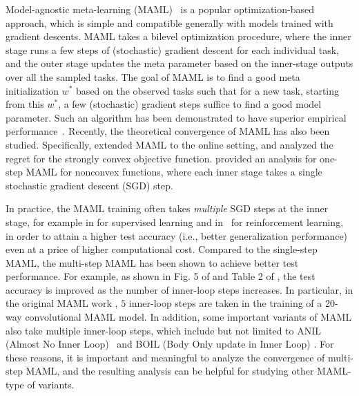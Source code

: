 \documentclass{osudissert96}
\begin{document}
Model-agnostic meta-learning (MAML)~\cite{finn2017model} is a popular optimization-based approach,  which is simple and compatible generally  with  models  trained with gradient descents. MAML takes a bilevel optimization procedure, where the inner stage runs a few steps of (stochastic) gradient descent for each individual task, and the outer stage updates the meta parameter based on the inner-stage outputs over all the sampled tasks. The goal of MAML is to find a good meta initialization $w^*$ based on the observed tasks such that for a new task, starting from this $w^*$, a few (stochastic) gradient steps suffice to find a good model parameter.  Such an algorithm has been demonstrated to have superior empirical performance~\cite{antoniou2019train,grant2018recasting,zintgraf2018caml,nichol2018first}. Recently, the theoretical convergence of MAML has also been studied. Specifically, \cite{finn2019online} extended MAML to the online setting, and analyzed the regret for the strongly convex objective function. %
\cite{fallah2020convergence} provided an analysis for one-step MAML for nonconvex functions, where each inner stage takes  a single stochastic gradient descent (SGD) step. 

In practice, the MAML training often takes {\em multiple} SGD steps at the inner stage, for example in \cite{finn2017model,antoniou2019train} for supervised learning and in~\cite{finn2017model,fallah2020provably} for reinforcement learning, in order to attain a higher test accuracy (i.e., better generalization performance) even at a price of higher computational cost. 
Compared to the single-step MAML, the multi-step MAML has been shown to achieve better test performance. For example, as shown in Fig. 5 of \cite{finn2017model} and Table 2 of \cite{antoniou2019train},  the test accuracy is improved as the number of inner-loop steps increases. In particular, in the original MAML work \cite{finn2017model}, $5$ inner-loop steps are taken in the training of a 20-way convolutional MAML model. In addition, some important variants of MAML also take multiple inner-loop steps, which include but not limited to ANIL (Almost No Inner Loop)~\cite{raghu2020rapid} and BOIL (Body Only
update in Inner Loop) \cite{oh2021boil}. For these reasons, it is important and meaningful to analyze the convergence of multi-step MAML, and the resulting analysis can be helpful for studying other
MAML-type of variants.  
\end{document}
